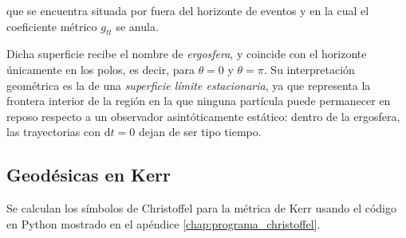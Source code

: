 que se encuentra situada por fuera del horizonte de eventos y en la cual el coeficiente métrico $g_{tt}$ se anula.

Dicha superficie recibe el nombre de \textit{ergosfera}, y coincide con el horizonte únicamente en los polos, es decir, para $\theta=0$ y $\theta=\pi$. Su interpretación geométrica es la de una \textit{superficie límite estacionaria}, ya que representa la frontera interior de la región en la que ninguna partícula puede permanecer en reposo respecto a un observador asintóticamente estático: dentro de la ergosfera, las trayectorias con $\mathrm{d}t=0$ dejan de ser tipo tiempo.



\subsection{Geodésicas en Kerr}

Se calculan los símbolos de Christoffel para la métrica de Kerr usando el código en Python mostrado en el apéndice \ref{chap:programa_christoffel}.

